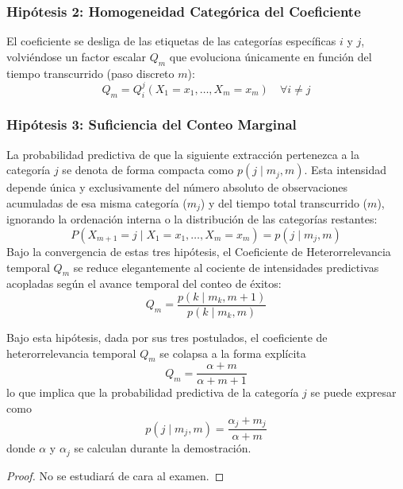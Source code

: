 \subsubsection{Hipótesis 2: Homogeneidad Categórica del Coeficiente}
\noindent
El coeficiente se desliga de las etiquetas de las categorías específicas $i$ y $j$, volviéndose un factor escalar $Q_m$ que evoluciona únicamente en función del tiempo transcurrido (paso discreto $m$):
\begin{equation*}
    Q_m = Q_i^j(X_1 = x_1, \dots, X_m = x_m) \quad \forall i \neq j
\end{equation*}

\subsubsection{Hipótesis 3: Suficiencia del Conteo Marginal}
\noindent
La probabilidad predictiva de que la siguiente extracción pertenezca a la categoría $j$ se denota de forma compacta como $p(j \mid m_j, m)$. Esta intensidad depende única y exclusivamente del número absoluto de observaciones acumuladas de esa misma categoría ($m_j$) y del tiempo total transcurrido ($m$), ignorando la ordenación interna o la distribución de las categorías restantes:
\begin{equation*}
    P(X_{m+1} = j \mid X_1 = x_1, \dots, X_m = x_m) = p(j \mid m_j, m)
\end{equation*}
Bajo la convergencia de estas tres hipótesis, el Coeficiente de Heterorrelevancia temporal $Q_m$ se reduce elegantemente al cociente de intensidades predictivas acopladas según el avance temporal del conteo de éxitos:
\begin{equation*}
    Q_m = \frac{p(k \mid m_k, m+1)}{p(k \mid m_k, m)}
\end{equation*}

\begin{teo}
    Bajo esta hipótesis, dada por sus tres postulados, el coeficiente de heterorrelevancia temporal $Q_m$ se colapsa a la forma explícita
    \[ Q_m = \frac{\alpha + m}{\alpha + m + 1} \] 
    lo que implica que la probabilidad predictiva de la categoría $j$ se puede expresar como 
    \[ p(j \mid m_j, m) = \frac{\alpha_j + m_j}{\alpha + m}\]
    donde $\alpha$ y $\alpha_j$ se calculan durante la demostración.
\begin{proof}
    No se estudiará de cara al examen.
\end{proof}
\end{teo}

